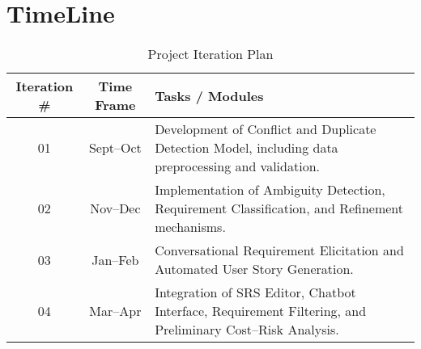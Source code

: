 \section{TimeLine}

\begin{table}[!ht]
\caption{Project Iteration Plan} 
\begin{tabular}{|c|c|p{9cm}|} \hline
\textbf{Iteration \#} & \textbf{Time Frame} & \textbf{Tasks / Modules} \\ \hline
01 & Sept–Oct & Development of Conflict and Duplicate Detection Model, including data preprocessing and validation. \\ \hline
02 & Nov–Dec  & Implementation of Ambiguity Detection, Requirement Classification, and Refinement mechanisms. \\ \hline
03 & Jan–Feb  & Conversational Requirement Elicitation and Automated User Story Generation. \\ \hline
04 & Mar–Apr  & Integration of SRS Editor, Chatbot Interface, Requirement Filtering, and Preliminary Cost–Risk Analysis. \\ \hline
\end{tabular}
\end{table}
